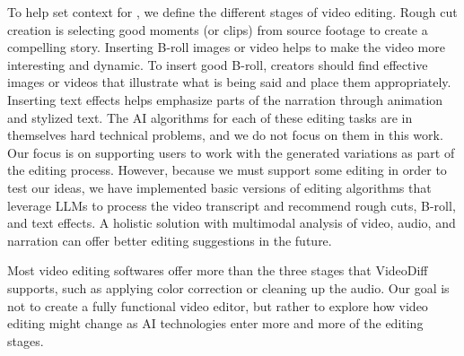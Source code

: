To help set context for \sysname{}, we define the different stages of video editing.
Rough cut creation is selecting good moments (or clips) from source footage to create a compelling story. Inserting B-roll images or video helps to make the video more interesting and dynamic. To insert good B-roll, creators should find effective images or videos that illustrate what is being said and place them appropriately. Inserting text effects helps emphasize parts of the narration through animation and stylized text. The AI algorithms for each of these editing tasks are in themselves hard technical problems, and we do not focus on them in this work. Our focus is on supporting users to work with the generated variations as part of the editing process. However, because we must support some editing in order to test our ideas, we have implemented basic versions of editing algorithms that leverage LLMs to process the video transcript and recommend rough cuts, B-roll, and text effects. A holistic solution with multimodal analysis of video, audio, and narration can offer better editing suggestions in the future.

Most video editing softwares offer more than the three stages that VideoDiff supports, such as applying color correction or cleaning up the audio. Our goal is not to create a fully functional video editor, but rather to explore how video editing might change as AI technologies enter more and more of the editing stages. 




